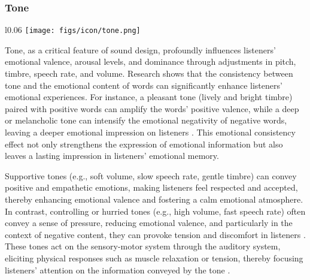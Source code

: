 \subsubsection{Tone}
\begin{wrapfigure}{l}{0.06\textwidth}
  \vspace{-11pt} %
        \texttt{[image: figs/icon/tone.png]}
\end{wrapfigure} 
Tone, as a critical feature of sound design, profoundly influences listeners’ emotional valence, arousal levels, and dominance through adjustments in pitch, timbre, speech rate, and volume. Research shows that the consistency between tone and the emotional content of words can significantly enhance listeners’ emotional experiences. For instance, a pleasant tone (lively and bright timbre) paired with positive words can amplify the words’ positive valence, while a deep or melancholic tone can intensify the emotional negativity of negative words, leaving a deeper emotional impression on listeners \cite{schirmer2010mark}. This emotional consistency effect not only strengthens the expression of emotional information but also leaves a lasting impression in listeners’ emotional memory.

Supportive tones (e.g., soft volume, slow speech rate, gentle timbre) can convey positive and empathetic emotions, making listeners feel respected and accepted, thereby enhancing emotional valence and fostering a calm emotional atmosphere. In contrast, controlling or hurried tones (e.g., high volume, fast speech rate) often convey a sense of pressure, reducing emotional valence, and particularly in the context of negative content, they can provoke tension and discomfort in listeners \cite{weinstein2018you}. These tones act on the sensory-motor system through the auditory system, eliciting physical responses such as muscle relaxation or tension, thereby focusing listeners’ attention on the information conveyed by the tone \cite{james1884mind, frijda1986emotions} .

